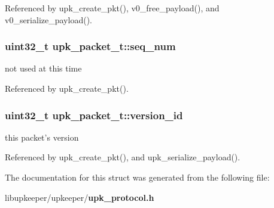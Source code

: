 Referenced by upk\_\-create\_\-pkt(), v0\_\-free\_\-payload(), and v0\_\-serialize\_\-payload().

\subsubsection[{seq\_\-num}]{\setlength{\rightskip}{0pt plus 5cm}uint32\_\-t {\bf upk\_\-packet\_\-t::seq\_\-num}}\label{structupk__packet__t_a80fc00b3c474ce2364b738c0cc2eefa2}
not used at this time 

Referenced by upk\_\-create\_\-pkt().

\subsubsection[{version\_\-id}]{\setlength{\rightskip}{0pt plus 5cm}uint32\_\-t {\bf upk\_\-packet\_\-t::version\_\-id}}\label{structupk__packet__t_a7af5bfe76852db8538b31fe06418c9d4}
this packet's version 

Referenced by upk\_\-create\_\-pkt(), and upk\_\-serialize\_\-payload().



The documentation for this struct was generated from the following file:\begin{DoxyCompactItemize}
\item 
libupkeeper/upkeeper/{\bf upk\_\-protocol.h}\end{DoxyCompactItemize}
